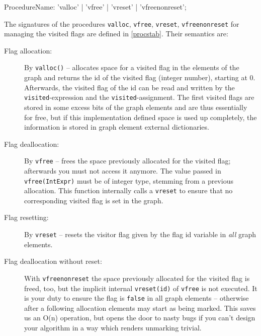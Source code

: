 \begin{rail}
  ProcedureName: 'valloc' | 'vfree' | 'vreset' | 'vfreenonreset';
\end{rail}

The signatures of the procedures \texttt{valloc}, \texttt{vfree}, \texttt{vreset}, \texttt{vfreenonreset} for managing the visited flags are defined in \ref{procstab}.
Their semantics are:
\begin{description}
\item[Flag allocation:] By \texttt{valloc()}\label{allocvisitflag} -- allocates space for a visited flag in the elements of the graph and returns the id of the visited flag (integer number), starting at 0.
Afterwards, the visited flag of the id can be read and written by the \texttt{visited}-expression and the \texttt{visited}-assignment.
The first visited flags are stored in some excess bits of the graph elements and are thus essentially for free,
but if this implementation defined space is used up completely, the information is stored in graph element external dictionaries.
\item[Flag deallocation:] By \texttt{vfree} -- frees the space previously allocated for the visited flag; afterwards you must not access it anymore.
The value passed in \texttt{vfree(IntExpr)} must be of integer type, stemming from a previous allocation.
This function internally calls a \texttt{vreset} to ensure that no corresponding visited flag is set in the graph.
\item[Flag resetting:] By \texttt{vreset} -- resets the visitor flag given by the flag id variable in \emph{all} graph elements.
\item[Flag deallocation without reset:] With \texttt{vfreenonreset} the space previously allocated for the visited flag is freed, too, but the implicit internal \texttt{vreset(id)} of \texttt{vfree} is not executed. It is your duty to ensure the flag is \texttt{false} in all graph elements -- otherwise after a following allocation elements may start as being marked. This saves us an O(n) operation, but opens the door to nasty bugs if you can't design your algorithm in a way which renders unmarking trivial.
\end{description}


